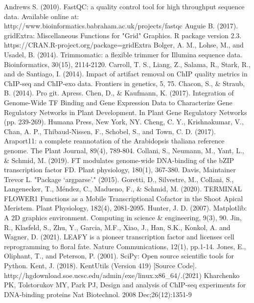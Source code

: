 \documentclass{article}
\begin{document}
\begin{sloppypar}
\begin{thebibliography}{9}
Andrews S. (2010). FastQC: a quality control tool for high throughput sequence data. Available online at: http://www.bioinformatics.babraham.ac.uk/projects/fastqc
Auguie B. (2017). gridExtra: Miscellaneous Functions for "Grid" Graphics. R package version 2.3. https://CRAN.R-project.org/package=gridExtra
Bolger, A. M., Lohse, M., and Usadel, B. (2014). Trimmomatic: a flexible trimmer for Illumina sequence data. Bioinformatics, 30(15), 2114-2120.
Carroll, T. S., Liang, Z., Salama, R., Stark, R., and de Santiago, I. (2014). Impact of artifact removal on ChIP quality metrics in ChIP-seq and ChIP-exo data. Frontiers in genetics, 5, 75.
Chacon, S., \& Straub, B. (2014). Pro git. Apress.
Chen, D., \& Kaufmann, K. (2017). Integration of Genome-Wide TF Binding and Gene Expression Data to Characterize Gene Regulatory Networks in Plant Development. In Plant Gene Regulatory Networks (pp. 239-269). Humana Press, New York, NY.
Cheng, C. Y., Krishnakumar, V., Chan, A. P., Thibaud‐Nissen, F., Schobel, S., and Town, C. D. (2017). Araport11: a complete reannotation of the Arabidopsis thaliana reference genome. The Plant Journal, 89(4), 789-804.
Collani, S., Neumann, M., Yant, L., \& Schmid, M. (2019). FT modulates genome-wide DNA-binding of the bZIP transcription factor FD. Plant physiology, 180(1), 367-380.
Davis, Maintainer Trevor L. "Package ‘argparse’." (2015).
Goretti, D., Silvestre, M., Collani, S., Langenecker, T., Méndez, C., Madueno, F., 
\& Schmid, M. (2020). TERMINAL FLOWER1 Functions as a Mobile Transcriptional Cofactor in the Shoot Apical Meristem. Plant Physiology, 182(4), 2081-2095.
Hunter, J. D. (2007). Matplotlib: A 2D graphics environment. Computing in science \& engineering, 9(3), 90.
Jin, R., Klasfeld, S., Zhu, Y., Garcia, M.F., Xiao, J., Han, S.K., Konkol, A. and Wagner, D. (2021). LEAFY is a pioneer transcription factor and licenses cell reprogramming to floral fate. Nature Communications, 12(1), pp.1-14.
Jones, E., Oliphant, T., and Peterson, P. (2001). SciPy: Open source scientific tools for Python.
Kent, J. (2018). KentUtils (Version 419) [Source Code]. http://hgdownload.soe.ucsc.edu/admin/exe/linux.x86\_64/.(2021)
Kharchenko PK, Tolstorukov MY, Park PJ, Design and analysis of ChIP-seq experiments for DNA-binding proteins Nat Biotechnol. 2008 Dec;26(12):1351-9

\end{thebibliography}
\end{sloppypar}
\end{document}
